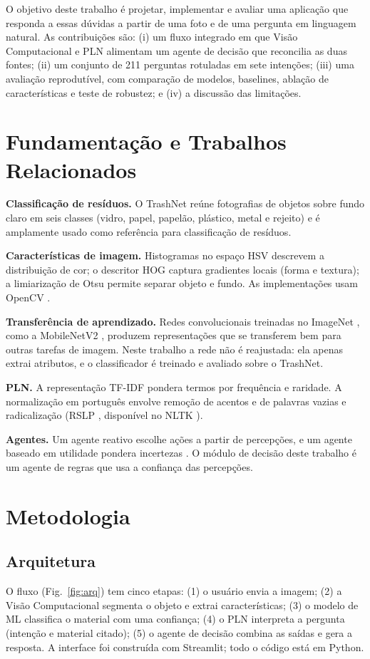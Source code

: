 \documentclass[conference]{IEEEtran}
\begin{document}
O objetivo deste trabalho é projetar, implementar e avaliar uma aplicação que responda a essas dúvidas a partir de uma foto e de uma pergunta em linguagem natural. As contribuições são: (i) um fluxo integrado em que Visão Computacional e PLN alimentam um agente de decisão que reconcilia as duas fontes; (ii) um conjunto de 211 perguntas rotuladas em sete intenções; (iii) uma avaliação reprodutível, com comparação de modelos, baselines, ablação de características e teste de robustez; e (iv) a discussão das limitações.

\section{Fundamentação e Trabalhos Relacionados}
\textbf{Classificação de resíduos.} O TrashNet \cite{trashnet} reúne fotografias de objetos sobre fundo claro em seis classes (vidro, papel, papelão, plástico, metal e rejeito) e é amplamente usado como referência para classificação de resíduos.

\textbf{Características de imagem.} Histogramas no espaço HSV descrevem a distribuição de cor; o descritor HOG \cite{hog} captura gradientes locais (forma e textura); a limiarização de Otsu \cite{otsu} permite separar objeto e fundo. As implementações usam OpenCV \cite{opencv}.

\textbf{Transferência de aprendizado.} Redes convolucionais treinadas no ImageNet \cite{imagenet}, como a MobileNetV2 \cite{mobilenet}, produzem representações que se transferem bem para outras tarefas de imagem. Neste trabalho a rede não é reajustada: ela apenas extrai atributos, e o classificador é treinado e avaliado sobre o TrashNet.

\textbf{PLN.} A representação TF-IDF \cite{tfidf} pondera termos por frequência e raridade. A normalização em português envolve remoção de acentos e de palavras vazias e radicalização (RSLP \cite{rslp}, disponível no NLTK \cite{nltk}).

\textbf{Agentes.} Um agente reativo escolhe ações a partir de percepções, e um agente baseado em utilidade pondera incertezas \cite{russell}. O módulo de decisão deste trabalho é um agente de regras que usa a confiança das percepções.

\section{Metodologia}
\subsection{Arquitetura}
O fluxo (Fig.~\ref{fig:arq}) tem cinco etapas: (1) o usuário envia a imagem; (2) a Visão Computacional segmenta o objeto e extrai características; (3) o modelo de ML classifica o material com uma confiança; (4) o PLN interpreta a pergunta (intenção e material citado); (5) o agente de decisão combina as saídas e gera a resposta. A interface foi construída com Streamlit; todo o código está em Python.
\end{document}
